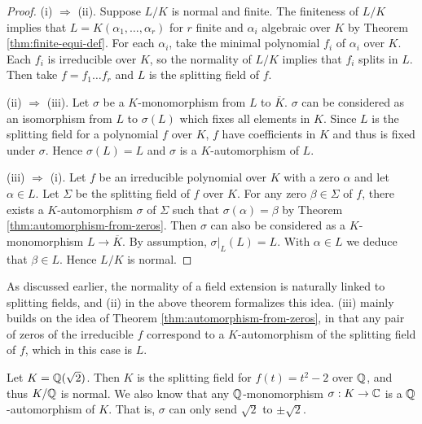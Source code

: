 \begin{proof}
    (i) $\Rightarrow$ (ii). 
    Suppose $L/K$ is normal and finite. The finiteness of $L/K$ implies that $L = K(\alpha_1, \dots, \alpha_r)$ for $r$ finite and $\alpha_i$ algebraic over $K$ by Theorem \ref{thm:finite-equi-def}. For each $\alpha_i$, take the minimal polynomial $f_i$ of $\alpha_i$ over $K$. Each $f_i$ is irreducible over $K$, so the normality of $L/K$ implies that $f_i$ splits in $L$.  Then take $f = f_1 \dots f_r$ and $L$ is the splitting field of $f$.
	
    

    (ii) $\Rightarrow$ (iii). Let $\sigma$ be a $K$-monomorphism from $L$ to $\overline K$. $\sigma$ can be considered as an isomorphism from $L$ to $\sigma(L)$ which fixes all elements in $K$. Since $L$ is the splitting field for a polynomial $f$ over $K$, $f$ have coefficients in $K$ and thus is fixed under $\sigma$. Hence $\sigma(L) = L$ and $\sigma$ is a $K$-automorphism of $L$. 
    
    (iii) $\Rightarrow$ (i). Let $f$ be an irreducible polynomial over $K$ with a zero $\alpha$ and let $\alpha \in L$. Let $\Sigma$ be the splitting field of $f$ over $K$. For any zero $\beta \in \Sigma$ of $f$, there exists a $K$-automorphism $\sigma$ of $\Sigma $ such that $\sigma(\alpha) = \beta$ by Theorem \ref{thm:automorphism-from-zeros}. Then $\sigma$ can also be considered as a $K$-monomorphism $L \to \overline K$. By assumption, $\sigma|_L(L) = L$. With $\alpha \in L$ we deduce that $\beta \in L$. Hence $L/K$ is normal.
\end{proof}

As discussed earlier, the normality of a field extension is naturally linked to splitting fields, and (ii) in the above theorem formalizes this idea. (iii) mainly builds on the idea of Theorem \ref{thm:automorphism-from-zeros}, in that any pair of zeros of the irreducible $f$ correspond to a $K$-automorphism of the splitting field of $f$, which in this case is $L$. 

\begin{example}
	Let $K = \mathbb Q (\sqrt 2)$. Then $K$ is the splitting field for $f(t) = t^2 - 2$ over $\mathbb Q$, and thus $K/ \mathbb Q$ is normal. We also know that any $\mathbb Q$-monomorphism $\sigma: K \to \mathbb C$ is a $\mathbb Q$-automorphism of $K$. That is, $\sigma$ can only send $\sqrt 2$ to $\pm \sqrt 2$. 
\end{example}

